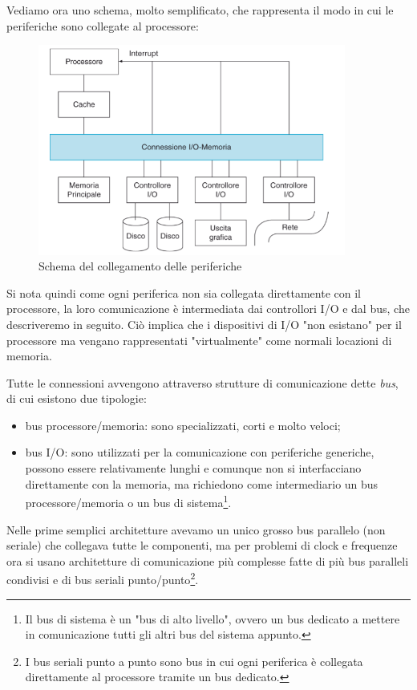 \documentclass[class=book, crop=false, oneside]{standalone}
\begin{document}
Vediamo ora uno schema, molto semplificato, che rappresenta il modo in cui le periferiche sono collegate al processore:
\begin{figure}[!h]
	\centering
	\includegraphics[width=0.9\textwidth,keepaspectratio]{schema-periferiche}
	\caption{Schema del collegamento delle periferiche}
\end{figure}
Si nota quindi come ogni periferica non sia collegata direttamente con il processore, la loro comunicazione è intermediata dai controllori I/O e dal bus, che descriveremo in seguito.
Ciò implica che i dispositivi di I/O "non esistano" per il processore ma vengano rappresentati "virtualmente" come normali locazioni di memoria.

Tutte le connessioni avvengono attraverso strutture di comunicazione dette \emph{bus}, di cui esistono due tipologie:
\begin{itemize}
	\item bus processore/memoria: sono specializzati, corti e molto veloci;
	\item bus I/O: sono utilizzati per la comunicazione con periferiche generiche, possono essere relativamente lunghi e comunque non si interfacciano direttamente con la memoria, ma richiedono come intermediario un bus processore/memoria o un bus di sistema\footnote{Il bus di sistema è un "bus di alto livello", ovvero un bus dedicato a  mettere in comunicazione tutti gli altri bus del sistema appunto.}.
\end{itemize}
Nelle prime semplici architetture avevamo un unico grosso bus parallelo (non seriale) che collegava tutte le componenti, ma per problemi di clock e frequenze ora si usano architetture di comunicazione più complesse fatte di più bus paralleli condivisi e di bus seriali punto/punto\footnote{I bus seriali punto a punto sono bus in cui ogni periferica è collegata direttamente al processore tramite un bus dedicato.}.
\end{document}
